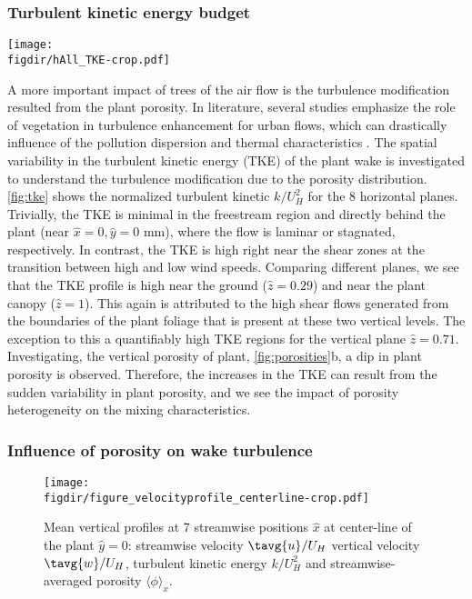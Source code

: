 \subsubsection*{Turbulent kinetic energy budget}
		
	\begin{sidewaysfigure}[p]
		\centering
		\texttt{[image: \\figdir/hAll\_TKE-crop.pdf]}
		\caption{Normalized turbulent kinetic energy $k/U_H^2$ at 8 horizontal planes, $\hat{z}=$ [$0.29$,\,$0.43$,\,$0.57$, $0.71$, $0.86$, $1.0$, $1.14$, $1.29]$.}
		\label{fig:tke}
	\end{sidewaysfigure}


A more important impact of trees of the air flow is the turbulence modification resulted from the plant porosity. In literature, several studies emphasize the role of vegetation in turbulence enhancement for urban flows, which can drastically influence of the pollution dispersion and thermal characteristics \citep{Amorim2013,Gromke2008,Poggi2004}. The spatial variability in the turbulent kinetic energy (TKE) of the plant wake is investigated to understand the turbulence modification due to the porosity distribution. \cref{fig:tke} shows the normalized turbulent kinetic $k/U_H^2$ for the 8 horizontal planes. Trivially, the TKE is minimal in the freestream region and directly behind the plant (near  $\hat{x}= 0, \hat{y} = 0$ mm), where the flow is laminar or stagnated, respectively. In contrast, the TKE is high right near the shear zones at the transition between high and low wind speeds. Comparing different planes, we see that the TKE profile is high near the ground ($\hat{z}=0.29$) and near the plant canopy ($\hat{z}=1$). This again is attributed to the high shear flows generated from the boundaries of the plant foliage that is present at these two vertical levels. The exception to this a quantifiably high TKE regions for the vertical plane $\hat{z}=0.71$. Investigating, the vertical porosity of plant, \cref{fig:porosities}b, a dip in plant porosity is observed. Therefore, the increases in the TKE can result from the sudden variability in plant porosity, and we see the impact of porosity heterogeneity on the mixing characteristics.

\subsubsection*{Influence of porosity on wake turbulence}
	
	\begin{figure}[t]
		\centering
		\texttt{[image: \\figdir/figure\_velocityprofile\_centerline-crop.pdf]}
		\caption{Mean vertical profiles at 7 streamwise positions $\hat{x}$ at center-line of the plant $\hat{y} = 0$:  streamwise velocity $\tavg{u}/U_H$  vertical velocity $\tavg{w}/U_H$,   turbulent kinetic energy $k/U_H^2$ and  streamwise-averaged porosity $\langle \phi \rangle_x$.}
		\label{fig:verticalprofile}
	\end{figure}

